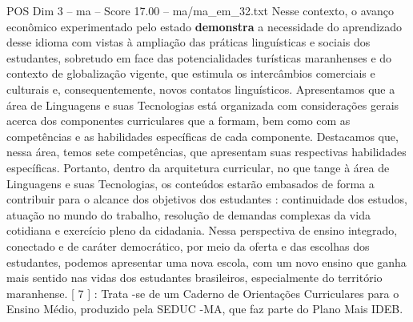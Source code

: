 \begin{textsample}{POS Dim 3 – ma – Score 17.00 – ma/ma\_em\_32.txt}
Nesse contexto, o avanço econômico experimentado pelo estado \textbf{demonstra} a necessidade do aprendizado desse idioma com vistas à ampliação das práticas linguísticas e sociais dos estudantes, sobretudo em face das potencialidades turísticas maranhenses e do contexto de globalização vigente, que estimula os intercâmbios comerciais e culturais e, consequentemente, novos contatos linguísticos.
Apresentamos que a área de Linguagens e suas Tecnologias está organizada com considerações gerais acerca dos componentes curriculares que a formam, bem como com as competências e as habilidades específicas de cada componente.
Destacamos que, nessa área, temos sete competências, que apresentam suas respectivas habilidades específicas.
Portanto, dentro da arquitetura curricular, no que tange à área de Linguagens e suas Tecnologias, os conteúdos estarão embasados de forma a contribuir para o alcance dos objetivos dos estudantes : continuidade dos estudos, atuação no mundo do trabalho, resolução de demandas complexas da vida cotidiana e exercício pleno da cidadania.
Nessa perspectiva de ensino integrado, conectado e de caráter democrático, por meio da oferta e das escolhas dos estudantes, podemos apresentar uma nova escola, com um novo ensino que ganha mais sentido nas vidas dos estudantes brasileiros, especialmente do território maranhense. [ 7 ] : Trata -se de um Caderno de Orientações Curriculares para o Ensino Médio, produzido pela SEDUC -MA, que faz parte do Plano Mais IDEB.

\end{textsample}
